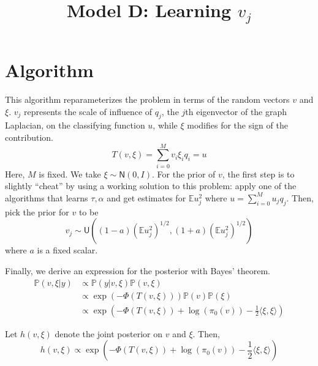 \documentclass{siamart1116}
\title{Model D: Learning $v_j$}
\author{\TheAuthors}
\date{}
\begin{document}
\maketitle
\setlength{\unitlength}{1in}
\setlength{\parindent}{0in}
\section{Algorithm}
This algorithm reparameterizes the problem in terms of the random vectors $v$ and $\xi$. $v_j$ represents the scale of influence of $q_j$, the $j$th eigenvector of the graph Laplacian, on the classifying function $u$, while $\xi$ modifies for the sign of the contribution.
\begin{equation}
\label{eqn:v_T}
T(v,\xi) = \sum_{i=0}^{M} v_i\xi_iq_i = u
\end{equation}
Here, $M$ is fixed. We take $\xi \sim \mathsf{N}(0, I)$. For the prior of $v$, the first step is to slightly ``cheat'' by using a working solution to this problem: apply one of the algorithms that learns $\tau, \alpha$ and get estimates for $\mathbb{E} u_j^2$ where $u = \sum_{i=0}^M u_j q_j$. Then, pick the prior for $v$ to be
\[v_j \sim \mathsf{U}\left((1-a)(\mathbb{E}u_j^2)^{1/2},(1+a)(\mathbb{E}u_j^2)^{1/2}\right)\]
where $a$ is a fixed scalar.

Finally, we derive an expression for the posterior with Bayes' theorem.
\begin{align*}
\mathbb{P}(v,\xi | y) &\propto \mathbb{P}(y|v, \xi) \mathbb{P}(v, \xi)\\
&\propto \exp \left(-\Phi(T(v,\xi)) \right) \mathbb{P}(v)\mathbb{P}(\xi) \\
&\propto \exp \left(-\Phi(T(v,\xi)) + \log (\pi_0(v)) - \frac{1}{2}\langle \xi, \xi \rangle  \right)
\end{align*}

Let $h(v,\xi)$ denote the joint posterior on $v$ and $\xi$. Then,
\begin{equation}
\label{eqn:learn_v_posterior}
h(v, \xi) \propto \exp \left(-\Phi(T(v,\xi)) + \log (\pi_0(v)) - \frac{1}{2}\langle \xi, \xi \rangle  \right)
\end{equation}
\end{document}
